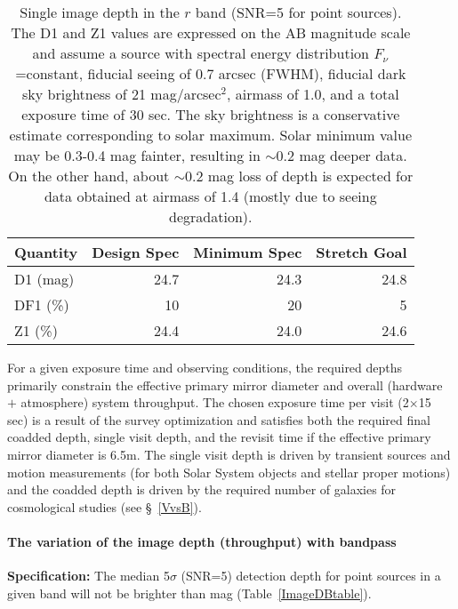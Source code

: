 \begin{table}[h]
\label{tsi}
\begin{tabular}{|l|r|r|r|}
\hline
Quantity        & Design Spec & Minimum Spec & Stretch Goal   \\
\hline
      D1 (mag)  &    24.7     &     24.3    &     24.8        \\
      DF1 (\%)  &    10       &      20     &       5         \\
      Z1  (\%)  &    24.4     &     24.0    &     24.6        \\
\hline
\end{tabular}
\caption{Single image depth in the $r$ band (SNR=5 for point sources).
The D1 and Z1 values are expressed on the AB magnitude scale
and assume a source with spectral energy distribution $F_\nu$=constant,
fiducial seeing of 0.7 arcsec (FWHM), fiducial dark sky brightness of
21 mag/arcsec$^2$, airmass of 1.0, and a total exposure time of 30 sec.
The sky brightness is a conservative estimate corresponding
to solar maximum. Solar minimum value may be 0.3-0.4 mag fainter, resulting
in $\sim$0.2 mag deeper data. On the other hand, about  $\sim$0.2 mag loss
of depth is expected for data obtained at airmass of 1.4 (mostly due to
seeing degradation). }
\label{ImageDtable}
\end{table}

For a given exposure time and observing conditions, the required depths
primarily constrain the effective primary mirror diameter and overall
(hardware $+$ atmosphere) system throughput. The chosen exposure time per visit
(2$\times$15 sec) is a result of the survey optimization and satisfies
both the required final coadded depth, single visit depth, and the revisit
time if the effective primary mirror diameter is 6.5m.
The single visit depth is driven by transient sources and motion measurements
(for both Solar System objects and stellar proper motions) and the coadded
depth is driven by the required number of galaxies for cosmological studies
(see \S~\ref{VvsB}).



\paragraph{The variation of the image depth (throughput) with bandpass\\}

{\bf Specification:} The median 5$\sigma$ (SNR=5) detection
depth for point sources in a given band will not be brighter than
mag (Table~\ref{ImageDBtable}).


